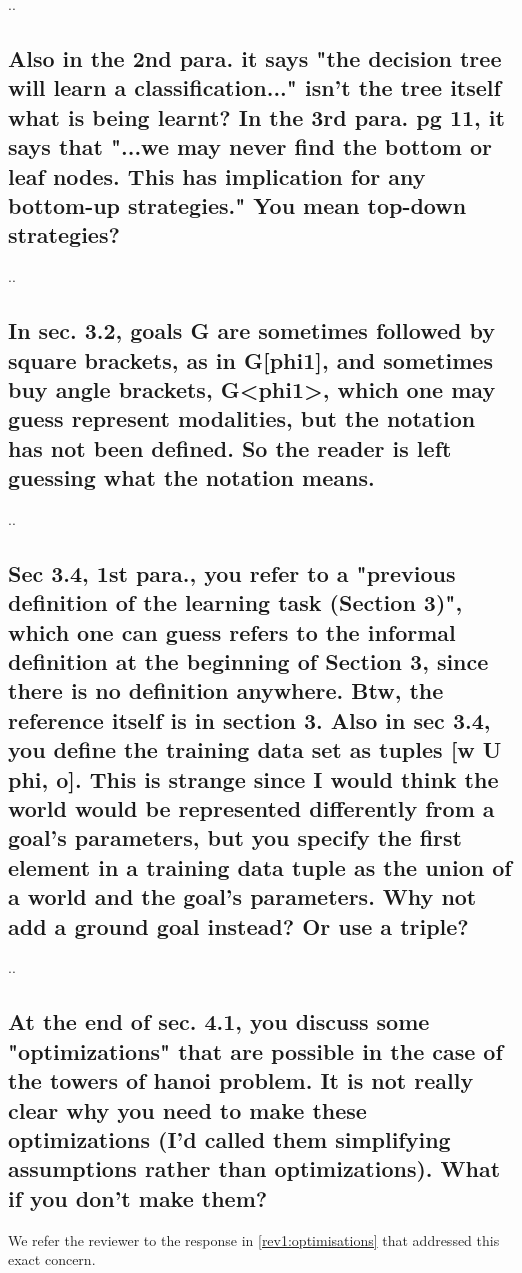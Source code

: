 \documentclass[preprint,12pt]{elsarticle}
\begin{document}
..

\subsection{ Also in the 2nd para. it says "the decision tree will learn a
classification..." isn't the tree itself what is being learnt?
In the 3rd para. pg 11, it says that "...we may never find the bottom
or leaf nodes. This has implication for any bottom-up strategies."
You mean top-down strategies?}

..

\subsection{ In sec. 3.2, goals G are sometimes followed by square brackets, as in
G[phi1], and sometimes buy angle brackets, G<phi1>, which one may
guess represent modalities, but the notation has not been defined. So
the reader is left guessing what the notation means.}

..

\subsection{ Sec 3.4, 1st para., you refer to a "previous definition of the
learning task (Section 3)", which one can guess refers to the informal
definition at the beginning of Section 3, since there is no definition
anywhere. Btw, the reference itself is in section 3.
Also in sec 3.4, you define the training data set as tuples
[w U phi, o]. This is strange since I would think the world would be
represented differently from a goal's parameters, but you specify the
first element in a training data tuple as the union of a world and
the goal's parameters. Why not add a ground goal instead? Or use a
triple?}

..

\subsection{ At the end of sec. 4.1, you discuss some "optimizations" that are
possible in the case of the towers of hanoi problem. It is not really
clear why you need to make these optimizations (I'd called them
simplifying assumptions rather than optimizations). What if you don't
make them?}

We refer the reviewer to the response in \ref{rev1:optimisations} that addressed this exact concern.
\end{document}
